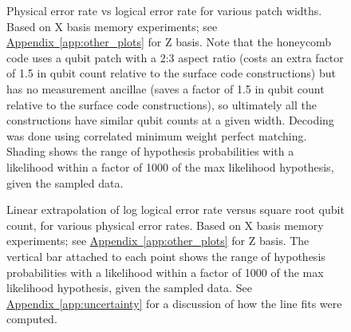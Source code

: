 \documentclass[onecolumn,unpublished,a4paper]{quantumarticle}
\theoremstyle{definition}
\theoremstyle{definition}
\theoremstyle{definition}
\DeclareRobustCommand{\app}[1]{\hyperref[app:#1]{Appendix~\ref*{app:#1}}}
\begin{document}
\begin{figure}[h]
    \centering
    \caption{
        Physical error rate vs logical error rate for various patch widths.
        Based on X basis memory experiments; see \app{other_plots} for Z basis.
        Note that the honeycomb code uses a qubit patch with a 2:3 aspect ratio (costs an extra factor of 1.5 in qubit count relative to the surface code constructions) but has no measurement ancillae (saves a factor of 1.5 in qubit count relative to the surface code constructions), so ultimately all the constructions have similar qubit counts at a given width.
        Decoding was done using correlated minimum weight perfect matching.
        Shading shows the range of hypothesis probabilities with a likelihood within a factor of 1000 of the max likelihood hypothesis, given the sampled data.
    }
    \label{fig:error_rate_plot}
\end{figure}

\begin{figure}[h]
    \centering
    \caption{
        Linear extrapolation of log logical error rate versus square root qubit count, for various physical error rates.
        Based on X basis memory experiments; see \app{other_plots} for Z basis.
        The vertical bar attached to each point shows the range of hypothesis probabilities with a likelihood within a factor of 1000 of the max likelihood hypothesis, given the sampled data.
        See \app{uncertainty} for a discussion of how the line fits were computed.
    }
    \label{fig:extrapolation_plot}
\end{figure}
\end{document}
